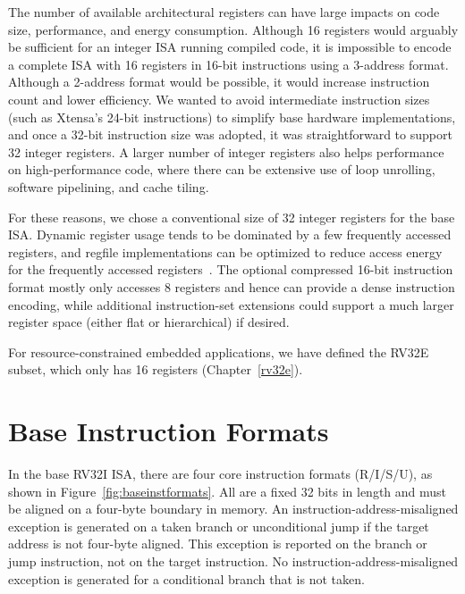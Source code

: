 \begin{commentary}
The number of available architectural registers can have large impacts
on code size, performance, and energy consumption.  Although 16
registers would arguably be sufficient for an integer ISA running
compiled code, it is impossible to encode a complete ISA with 16
registers in 16-bit instructions using a 3-address format.  Although a
2-address format would be possible, it would increase instruction
count and lower efficiency.  We wanted to avoid intermediate
instruction sizes (such as Xtensa's 24-bit instructions) to simplify
base hardware implementations, and once a 32-bit instruction size was
adopted, it was straightforward to support 32 integer registers.  A
larger number of integer registers also helps performance on
high-performance code, where there can be extensive use of loop
unrolling, software pipelining, and cache tiling.

For these reasons, we chose a conventional size of 32 integer
registers for the base ISA.  Dynamic register usage tends to be
dominated by a few frequently accessed registers, and regfile
implementations can be optimized to reduce access energy for the
frequently accessed registers~\cite{jtseng:sbbci}.  The optional
compressed 16-bit instruction format mostly only accesses 8 registers
and hence can provide a dense instruction encoding, while additional
instruction-set extensions could support a much larger register space
(either flat or hierarchical) if desired.

For resource-constrained embedded applications, we have defined the
RV32E subset, which only has 16 registers (Chapter~\ref{rv32e}).
\end{commentary}

\section{Base Instruction Formats}

In the base RV32I ISA, there are four core instruction formats
(R/I/S/U), as shown in Figure~\ref{fig:baseinstformats}.  All are a
fixed 32 bits in length and must be aligned on a four-byte boundary in
memory.  An instruction-address-misaligned exception is generated on a
taken branch or unconditional jump if the target address is not
four-byte aligned.  This exception is reported on the branch or jump
instruction, not on the target instruction.  No
instruction-address-misaligned exception is generated for a
conditional branch that is not taken.

